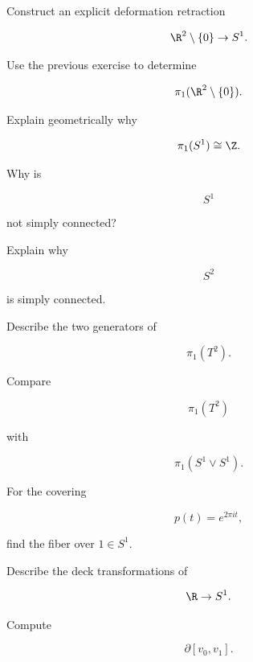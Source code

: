 \begin{exercise}[2]
Construct an explicit deformation retraction

\[
\R^2\setminus\{0\}
\to
S^1.
\]
\end{exercise}

\begin{exercise}[2]
Use the previous exercise to determine

\[
\pi_1(\R^2\setminus\{0\}).
\]
\end{exercise}

\begin{exercise}[2]
Explain geometrically why

\[
\pi_1(S^1)\cong\Z.
\]
\end{exercise}

\begin{exercise}[2]
Why is

\[
S^1
\]

not simply connected?
\end{exercise}

\begin{exercise}[2]
Explain why

\[
S^2
\]

is simply connected.
\end{exercise}

\begin{exercise}[2]
Describe the two generators of

\[
\pi_1(T^2).
\]
\end{exercise}

\begin{exercise}[2]
Compare

\[
\pi_1(T^2)
\]

with

\[
\pi_1(S^1\vee S^1).
\]
\end{exercise}

\begin{exercise}[2]
For the covering

\[
p(t)=e^{2\pi i t},
\]

find the fiber over \(1\in S^1\).
\end{exercise}

\begin{exercise}[2]
Describe the deck transformations of

\[
\R\to S^1.
\]
\end{exercise}

\begin{exercise}[2]
Compute

\[
\partial[v_0,v_1].
\]
\end{exercise}

